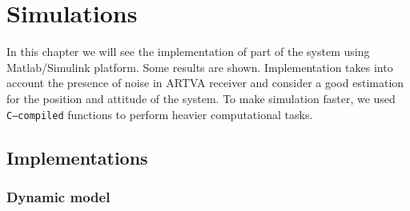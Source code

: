 \chapter{Simulations}
\minitoc
\thispagestyle{plain}
\def\saltino{\vspace{0.5cm}}

In this chapter we will see the implementation of part of the system using Matlab/Simulink platform. Some results are shown. Implementation takes into account the presence of noise in ARTVA receiver and consider a good estimation for the position and attitude of the system. To make simulation faster, we used \texttt{C--compiled} functions to perform heavier computational tasks. 

\section{Implementations}

\subsection{Dynamic model}

